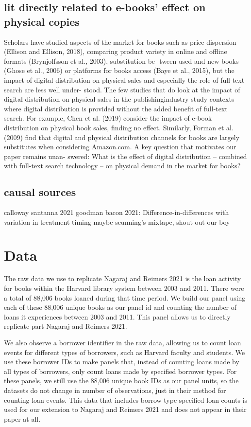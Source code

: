 \documentclass{article}
\begin{document}
\subsection{lit directly related to e-books' effect on physical copies}
Scholars have studied aspects of the market for books such as price dispersion (Ellison and Ellison, 2018), comparing product variety in online and offline formats (Brynjolfsson et al., 2003), substitution be- tween used and new books (Ghose et al., 2006) or platforms for books access (Baye et al., 2015), but the impact of digital distribution on physical sales and especially the role of full-text search are less well under- stood. The few studies that do look at the impact of digital distribution on physical sales in the publishingindustry study contexts where digital distribution is provided without the added benefit of full-text search. For example, Chen et al. (2019) consider the impact of e-book distribution on physical book sales, finding no effect. Similarly, Forman et al. (2009) find that digital and physical distribution channels for books are largely substitutes when considering Amazon.com. A key question that motivates our paper remains unan- swered: What is the effect of digital distribution – combined with full-text search technology – on physical demand in the market for books?

\subsection{causal sources}
calloway santanna 2021
goodman bacon 2021: Difference-in-differences with variation in treatment timing
maybe scunning's mixtape, shout out our boy

\section{Data}
The raw data we use to replicate Nagaraj and Reimers 2021 is the loan activity for books within the Harvard library system between 2003 and 2011. There were a total of 88,006 books loaned during that time period. We build our panel using each of these 88,006 unique books as our panel id and counting the number of loans it experiences between 2003 and 2011. This panel allows us to directly replicate part Nagaraj and Reimers 2021. 

We also observe a borrower identifier in the raw data, allowing us to count loan events for different types of borrowers, such as Harvard faculty and students. We use these borrower IDs to make panels that, instead of counting loans made by all types of borrowers, only count loans made by specified borrower types. For these panels, we still use the 88,006 unique book IDs as our panel units, so the datasets do not change in number of observations, just in their method for counting loan events. This data that includes borrow type specified loan counts is used for our extension to Nagaraj and Reimers 2021 and does not appear in their paper at all. 
\end{document}
